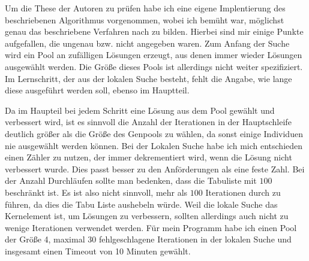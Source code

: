Um die These der Autoren zu prüfen habe ich eine eigene Implentierung des beschriebenen Algorithmus vorgenommen, wobei ich bemüht war, möglichst genau das beschriebene Verfahren nach zu bilden.
Hierbei sind mir einige Punkte aufgefallen, die ungenau bzw. nicht angegeben waren. 
Zum Anfang der Suche wird ein Pool an zufälligen Lösungen erzeugt, aus denen immer wieder Lösungen ausgewählt werden. Die Größe dieses Pools ist allerdings nicht weiter spezifiziert. 
Im Lernschritt, der aus der lokalen Suche besteht, fehlt die Angabe, wie lange diese ausgeführt werden soll, ebenso im Hauptteil.

Da im Haupteil bei jedem Schritt eine Lösung aus dem Pool gewählt und verbessert wird, ist es sinnvoll die Anzahl der Iterationen in der Hauptschleife deutlich größer als die Größe des Genpools zu wählen, 
da sonst einige Individuen nie ausgewählt werden können. Bei der Lokalen Suche habe ich mich entschieden einen Zähler zu nutzen, der immer dekrementiert wird, wenn die Lösung nicht verbessert wurde.
Dies passt besser zu den Anförderungen als eine feste Zahl. Bei der Anzahl Durchläufen sollte man bedenken, dass die Tabuliste mit $100$ beschränkt ist. 
Es ist also nicht sinnvoll, mehr als $100$ Iterationen durch zu führen, da dies die Tabu Liste aushebeln würde. 
Weil die lokale Suche das Kernelement ist, um Lösungen zu verbessern, sollten allerdings auch nicht zu wenige Iterationen verwendet werden.
Für mein Programm habe ich einen Pool der Größe 4, maximal 30 fehlgeschlagene Iterationen in der lokalen Suche und insgesamt einen Timeout von 10 Minuten gewählt. 



